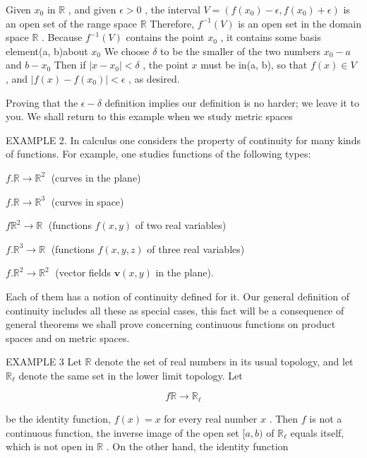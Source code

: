Given \({x}_{0}\) in \(\mathbb{R}\) , and given \(\epsilon  > 0\) , the interval \(V = \left( {f\left( {x}_{0}\right)  - \epsilon ,f\left( {x}_{0}\right)  + \epsilon }\right)\) is an open set of the range space \(\mathbb{R}\) Therefore, \({f}^{-1}\left( V\right)\) is an open set in the domain space \(\mathbb{R}\) . Because \({f}^{-1}\left( V\right)\) contains the point \({x}_{0}\) , it contains some basis element(a, b)about \({x}_{0}\) We choose \(\delta\) to be the smaller of the two numbers \({x}_{0} - a\) and \(b - {x}_{0}\) Then if \(\left| {x - {x}_{0}}\right|  < \delta\) , the point \(x\) must be in(a, b), so that \(f\left( x\right)  \in  V\) , and \(\left| {f\left( x\right)  - f\left( {x}_{0}\right) }\right|  < \epsilon\) , as desired.

Proving that the \(\epsilon  - \delta\) definition implies our definition is no harder; we leave it to you. We shall return to this example when we study metric spaces

EXAMPLE 2. In calculus one considers the property of continuity for many kinds of functions. For example, one studies functions of the following types:

\(f.\mathbb{R} \rightarrow  {\mathbb{R}}^{2}\;\) (curves in the plane)

\(f.\mathbb{R} \rightarrow  {\mathbb{R}}^{3}\;\) (curves in space)

\(f{\mathbb{R}}^{2} \rightarrow  \mathbb{R}\;\) (functions \(f\left( {x,y}\right)\) of two real variables)

\(f.{\mathbb{R}}^{3} \rightarrow  \mathbb{R}\;\) (functions \(f\left( {x,y,z}\right)\) of three real variables)

\(f.{\mathbb{R}}^{2} \rightarrow  {\mathbb{R}}^{2}\;\) (vector fields \(\mathbf{v}\left( {x,y}\right)\) in the plane).

Each of them has a notion of continuity defined for it. Our general definition of continuity includes all these as special cases, this fact will be a consequence of general theorems we shall prove concerning continuous functions on product spaces and on metric spaces.

EXAMPLE 3 Let \(\mathbb{R}\) denote the set of real numbers in its usual topology, and let \({\mathbb{R}}_{\ell }\) denote the same set in the lower limit topology. Let

\[
f\mathbb{R} \rightarrow  {\mathbb{R}}_{\ell }
\]

be the identity function, \(f\left( x\right)  = x\) for every real number \(x\) . Then \(f\) is not a continuous function, the inverse image of the open set \(\lbrack a,b)\) of \({\mathbb{R}}_{\ell }\) equals itself, which is not open in \(\mathbb{R}\) . On the other hand, the identity function

